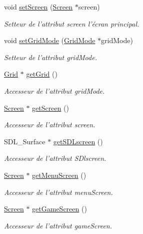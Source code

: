 \begin{DoxyCompactItemize}
\item 
void \hyperlink{classEngine_a0271409e3d247a540e1f267627dded4e}{set\-Screen} (\hyperlink{classScreen}{Screen} $\ast$screen)
\begin{DoxyCompactList}\small\item\em Setteur de l'attribut screen l'écran principal. \end{DoxyCompactList}\item 
void \hyperlink{classEngine_aa2c787d89892ad75da20ce4d4c5561de}{set\-Grid\-Mode} (\hyperlink{classGridMode}{Grid\-Mode} $\ast$grid\-Mode)
\begin{DoxyCompactList}\small\item\em Setteur de l'attribut grid\-Mode. \end{DoxyCompactList}\item 
\hyperlink{classGrid}{Grid} $\ast$ \hyperlink{classEngine_ad03dd023db9027a1268a65fd04295e66}{get\-Grid} ()
\begin{DoxyCompactList}\small\item\em Accesseur de l'attribut grid\-Mode. \end{DoxyCompactList}\item 
\hyperlink{classScreen}{Screen} $\ast$ \hyperlink{classEngine_af620e94fcf485aaec49d1dde7d6f389f}{get\-Screen} ()
\begin{DoxyCompactList}\small\item\em Accesseur de l'attribut screen. \end{DoxyCompactList}\item 
S\-D\-L\-\_\-\-Surface $\ast$ \hyperlink{classEngine_a0bfca2729728e42d6ac31b77e20a9dae}{get\-S\-D\-Lscreen} ()
\begin{DoxyCompactList}\small\item\em Accesseur de l'attribut S\-Dlscreen. \end{DoxyCompactList}\item 
\hyperlink{classScreen}{Screen} $\ast$ \hyperlink{classEngine_a212ec7844a597a360b03d8a125e53f5e}{get\-Menu\-Screen} ()
\begin{DoxyCompactList}\small\item\em Accesseur de l'attribut menu\-Screen. \end{DoxyCompactList}\item 
\hyperlink{classScreen}{Screen} $\ast$ \hyperlink{classEngine_af6d0e82cecee32853a37ebdb9ea9fcc1}{get\-Game\-Screen} ()
\begin{DoxyCompactList}\small\item\em Accesseur de l'attribut game\-Screen. \end{DoxyCompactList}\item 

\end{DoxyCompactItemize}
